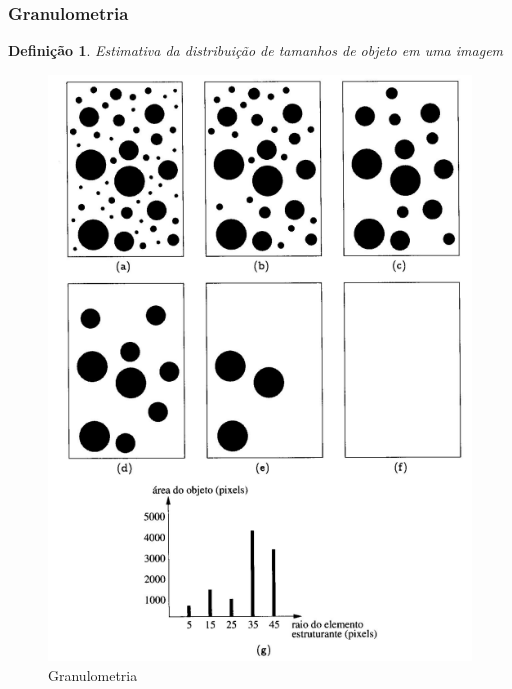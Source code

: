 \documentclass[aspectratio=169]{beamer}
\theoremstyle{Definition}
\newtheorem{defn}{Defini\c c\~ao}
\begin{document}
\begin{frame}
	\frametitle{Granulometria}
	
	\begin{defn}
		Estimativa da distribuição de tamanhos de objeto em uma imagem
	\end{defn}
	
	\begin{figure}[h]
	 	\includegraphics[height=0.5\paperheight]{imagens/granulometria}
		\caption{Granulometria}\label{figGranulo}
	\end{figure}

\end{frame}
\end{document}
